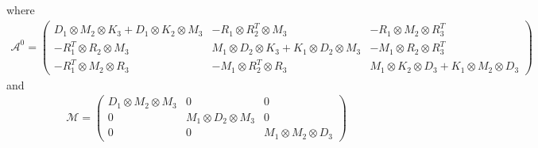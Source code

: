 where
\begin{align}
  \mathcal{A}^0 = 
  \begin{pmatrix}
    D_1 \otimes M_2 \otimes K_3 + D_1 \otimes K_2 \otimes M_3  &                          - R_1 \otimes R_2^T \otimes M_3   &  - R_1 \otimes M_2 \otimes R_3^T \\
                               - R_1^T \otimes R_2 \otimes M_3 & M_1 \otimes D_2 \otimes K_3 + K_1 \otimes D_2 \otimes M_3  &  - M_1 \otimes R_2 \otimes R_3^T \\
                               - R_1^T \otimes M_2 \otimes R_3 &                          - M_1 \otimes R_2^T \otimes R_3   & M_1 \otimes K_2 \otimes D_3 + K_1 \otimes M_2 \otimes D_3  
  \end{pmatrix}
  \label{eq:matrix-A0-3d}
\end{align}
and
\begin{align}
  \mathcal{M} = 
  \begin{pmatrix}
    D_1 \otimes M_2 \otimes M_3   & 0   &  0 \\
    0 & M_1 \otimes D_2 \otimes M_3   &  0 \\
    0 & 0 &  M_1 \otimes M_2 \otimes D_3 
  \end{pmatrix}
  \label{eq:matrix-M-3d}
\end{align}
